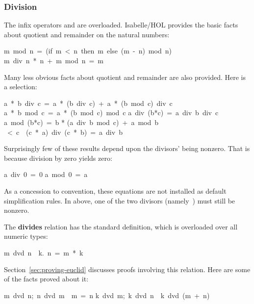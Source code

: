 \subsubsection{Division}
%
The infix operators  and  are overloaded.
Isabelle/HOL provides the basic facts about quotient and remainder
on the natural numbers:
\begin{isabelle}
m\ mod\ n\ =\ (if\ m\ <\ n\ then\ m\ else\ (m\ -\ n)\ mod\ n)
\isanewline
m\ div\ n\ *\ n\ +\ m\ mod\ n\ =\ m%
\end{isabelle}

Many less obvious facts about quotient and remainder are also provided. 
Here is a selection:
\begin{isabelle}
a\ *\ b\ div\ c\ =\ a\ *\ (b\ div\ c)\ +\ a\ *\ (b\ mod\ c)\ div\ c%
\isanewline
a\ *\ b\ mod\ c\ =\ a\ *\ (b\ mod\ c)\ mod\ c%
\isanewline
a\ div\ (b*c)\ =\ a\ div\ b\ div\ c%
\isanewline
a\ mod\ (b*c)\ =\ b * (a\ div\ b\ mod\ c)\ +\ a\ mod\ b%
\ <\ c\ \isasymLongrightarrow \ (c\ *\ a)\ div\ (c\ *\ b)\ =\ a\ div\ b%
\end{isabelle}

Surprisingly few of these results depend upon the
divisors' being nonzero.
%
That is because division by
zero yields zero:
\begin{isabelle}
a\ div\ 0\ =\ 0
\isanewline
a\ mod\ 0\ =\ a%
\end{isabelle}
As a concession to convention, these equations are not installed as default
simplification rules.  In  above, one of
the two divisors (namely~) must still be nonzero.

The \textbf{divides} relation
has the standard definition, which
is overloaded over all numeric types: 
\begin{isabelle}
m\ dvd\ n\ \isasymequiv\ {\isasymexists}k.\ n\ =\ m\ *\ k
\end{isabelle}
%
Section~\ref{sec:proving-euclid} discusses proofs involving this
relation.  Here are some of the facts proved about it:
\begin{isabelle}
\isasymlbrakk m\ dvd\ n;\ n\ dvd\ m\isasymrbrakk \ \isasymLongrightarrow \ m\ =\ n%
\isanewline
\isasymlbrakk k\ dvd\ m;\ k\ dvd\ n\isasymrbrakk \ \isasymLongrightarrow \ k\ dvd\ (m\ +\ n)
\end{isabelle}

